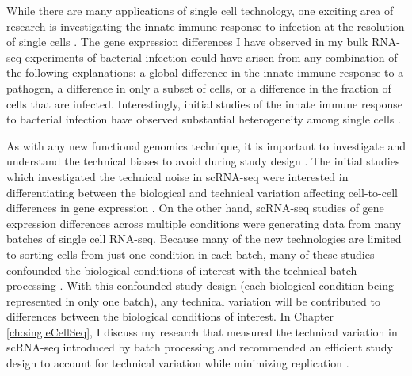 While there are many applications of single cell technology, one
exciting area of research is investigating the innate immune response
to infection at the resolution of single cells \citep{Satija2014,
  Proserpio2016}. The gene expression differences I have observed in
my bulk RNA-seq experiments of bacterial infection could have arisen
from any combination of the following explanations: a global
difference in the innate immune response to a pathogen, a difference
in only a subset of cells, or a difference in the fraction of cells
that are infected. Interestingly, initial studies of the innate immune
response to bacterial infection have observed substantial
heterogeneity among single cells \citep{Shalek2013, Jaitin2014,
  Shalek2014, Avraham2015}.

As with any new functional genomics technique, it is important to
investigate and understand the technical biases to avoid during study
design \citep{Auer2010, Leek2010, Gilad2015}. The initial studies
which investigated the technical noise in scRNA-seq were interested in
differentiating between the biological and technical variation
affecting cell-to-cell differences in gene expression
\citep{Brennecke2013, Grun2014, Islam2014, Ding2015, Vallejos2015}.
On the other hand, scRNA-seq studies of gene expression differences
across multiple conditions were generating data from many batches of
single cell RNA-seq. Because many of the new technologies are limited
to sorting cells from just one condition in each batch, many of these
studies confounded the biological conditions of interest with the
technical batch processing \citep{Hicks2015}. With this confounded
study design (each biological condition being represented in only one
batch), any technical variation will be contributed to differences
between the biological conditions of interest. In Chapter
\ref{ch:singleCellSeq}, I discuss my research that measured the
technical variation in scRNA-seq introduced by batch processing and
recommended an efficient study design to account for technical
variation while minimizing replication \citep{Tung2016}.
